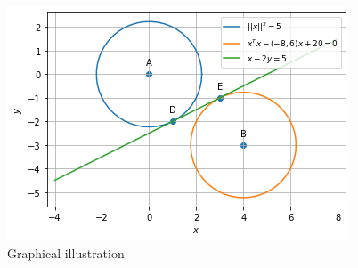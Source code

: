 \documentclass[journal,12pt,twocolumn]{IEEEtran}
\begin{document}
\begin{figure}[htp]
    \centering
    \includegraphics[width = \columnwidth]{a_3.png}
    \caption{Graphical illustration}
\end{figure}
\end{document}
